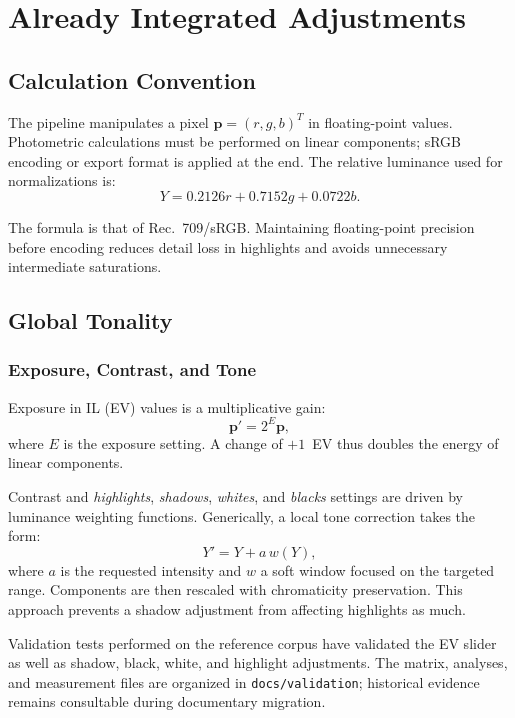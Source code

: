 \chapter{Already Integrated Adjustments}
\label{chap:reglages-existants}

\section{Calculation Convention}

The pipeline manipulates a pixel $\mathbf{p}=(r,g,b)^T$ in floating-point values. Photometric calculations must be performed on linear components; sRGB encoding or export format is applied at the end. The relative luminance used for normalizations is:
\begin{equation}
  Y = 0.2126r + 0.7152g + 0.0722b.
\end{equation}

The formula is that of Rec.~709/sRGB. Maintaining floating-point precision before encoding reduces detail loss in highlights and avoids unnecessary intermediate saturations.

\section{Global Tonality}

\subsection{Exposure, Contrast, and Tone}

Exposure in IL (EV) values is a multiplicative gain:
\begin{equation}
  \mathbf{p}' = 2^{E}\mathbf{p},
\end{equation}
where $E$ is the exposure setting. A change of $+1$~EV thus doubles the energy of linear components.

Contrast and \emph{highlights}, \emph{shadows}, \emph{whites}, and \emph{blacks} settings are driven by luminance weighting functions. Generically, a local tone correction takes the form:
\begin{equation}
  Y' = Y + a\,w(Y),
\end{equation}
where $a$ is the requested intensity and $w$ a soft window focused on the targeted range. Components are then rescaled with chromaticity preservation. This approach prevents a shadow adjustment from affecting highlights as much.

Validation tests performed on the reference corpus have validated the EV slider as well as shadow, black, white, and highlight adjustments. The matrix, analyses, and measurement files are organized in \texttt{docs/validation}; historical evidence remains consultable during documentary migration.

